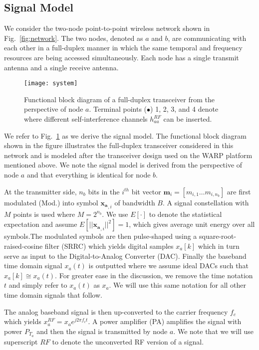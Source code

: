 \documentclass[12pt, journal,draftcls,letterpaper,onecolumn]{IEEEtran}
\begin{document}
\subsection{Signal Model}
\label{subsec:signal_model}
We consider the two-node point-to-point wireless network shown in Fig.~\ref{fig:network}.  The two nodes, denoted as $a$ and $b$, are communicating with each other in a full-duplex manner in which the same temporal and frequency resources are being accessed simultaneously.  Each node has a single transmit antenna and a single receive antenna.  
\begin{figure}[htp] 
\begin{center} 
\texttt{[image: system]}
\caption[fig:system]{Functional block diagram of a full-duplex transceiver from the perspective of node $a$.  Terminal points ($\bullet$) 1, 2, 3, and 4 denote where different self-interference channels $h_{aa}^{RF}$ can be inserted.} 
  \label{fig:system}
\end{center} 
\end{figure} 
We refer to Fig.~\ref{fig:system} as we derive the signal model.  The functional block diagram shown in the figure illustrates the full-duplex transceiver considered in this network and is modeled after the transceiver design used on the WARP platform mentioned above. We note the signal model is derived from the perspective of node $a$ and that everything is identical for node $b$.  

At the transmitter side, $n_b$ bits in the $i^{th}$ bit vector $\mathbf{m}_i = [m_{i,1} \dots m_{i,n_b}]$ are first modulated (Mod.) into symbol $\mathbf{x_{a}}_{,i}$ of bandwidth $B$.  A signal constellation with $M$ points is used where $M = 2^{n_b}$.  We use $E[\cdot ]$ to denote the statistical expectation and assume $E[||\mathbf{x_{a}}_{,i}||^2] = 1$, which gives average unit energy over all symbols.The modulated symbols are then pulse-shaped using a square-root-raised-cosine filter (SRRC) which yields digital samples $x_a[k]$ which in turn serve as input to the Digital-to-Analog Converter (DAC).  Finally the baseband time domain signal $x_a(t)$ is outputted where we assume ideal DACs such that $x_a[k] \cong x_a(t)$.  For greater ease in the discussion, we remove the time notation $t$ and simply refer to $x_a(t)$ as $x_a$.  We will use this same notation for all other time domain signals that follow.  

The analog baseband signal is then up-converted to the carrier frequency $f_c$ which yields $x_a^{RF} = x_a e^{j 2\pi f_c t}$.  A power amplifier (PA) amplifies the signal with power $P_{T_a}$ and then the signal is transmitted by node $a$.  We note that we will use superscript $RF$ to denote the unconverted RF version of a signal.
\end{document}

